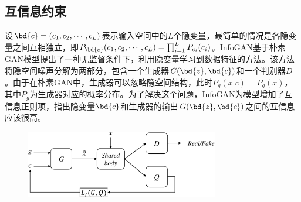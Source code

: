 \subsection{互信息约束}
设$\bd{c} = (c_1, c_2, \cdots, c_L)$表示输入空间中的$L$个隐变量，最简单的情况是各隐变量之间互相独立，即$P_{\bd{c}}(c_1, c_2, \cdots, c_L) = \prod_{i=1}^L P_{c_i}(c_i)$。InfoGAN基于朴素GAN模型提出了一种无监督条件下，利用隐变量学习到数据特征的方法。该方法将隐空间噪声分解为两部分，包含一个生成器$G(\bd{z}, \bd{c})$和一个判别器$D$。由于在朴素GAN中，生成器可以忽略隐空间结构，此时$P_g(x|c) = P_g(x)$，其中$P_g$为生成器对应的概率分布。为了解决这个问题，InfoGAN为模型增加了互信息正则项，指出隐变量$\bd{c}$和生成器的输出$G(\bd{z}, \bd{c})$之间的互信息应该很高。
\begin{figure}[hbtp]
  \centering
  \includegraphics[width=0.75\textwidth]{Img/arch-infogan.pdf}
  \label{fig:arch-infogan}
\end{figure}

